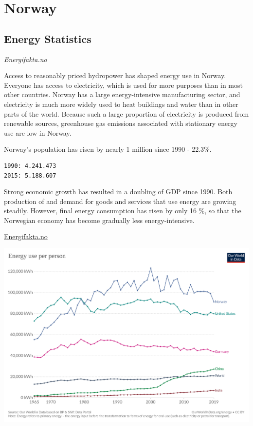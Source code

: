 \documentclass[
]{book}
\begin{document}
\hypertarget{norway}{%
\chapter{Norway}\label{norway}}

\hypertarget{energy-statistics-1}{%
\section{Energy Statistics}\label{energy-statistics-1}}

\emph{Energifakta.no}

Access to reasonably priced hydropower has shaped energy use in Norway. Everyone has access to electricity, which is used for more purposes than in most other countries. Norway has a large energy-intensive manufacturing sector, and electricity is much more widely used to heat buildings and water than in other parts of the world. Because such a large proportion of electricity is produced from renewable sources, greenhouse gas emissions associated with stationary energy use are low in Norway.

Norway's population has risen by nearly 1 million since 1990 - 22.3\%.

\begin{verbatim}
1990: 4.241.473
2015: 5.188.607 
\end{verbatim}

Strong economic growth has resulted in a doubling of GDP since 1990. Both production of and demand for goods and services that use energy are growing steadily.
However, final energy consumption has risen by only 16 \%, so that the Norwegian economy has become gradually less energy-intensive.

\href{https://energifaktanorge.no/en/norsk-energibruk/}{Energifakta.no}

\includegraphics{fig/owid_energy_use_pc_no_us_de_ch_in-wd.png}
\end{document}
